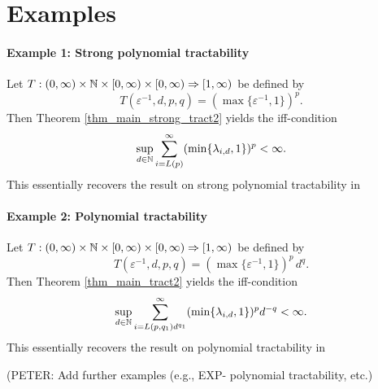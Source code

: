 \documentclass[11pt,a4paper]{article}
\newcommand{\peter}[1]{\begingroup\color{purple}#1\endgroup}
\begin{document}
\section{Examples}

\paragraph{Example 1: Strong polynomial tractability}

Let $T: (0,\infty) \times \mathbb{N} \times [0,\infty) \times [0,\infty)\Rightarrow [1,\infty)$
be defined by
\[
 T(\varepsilon^{-1},d,p,q)= (\max\{\varepsilon^{-1},1\})^p .
\]
Then Theorem \ref{thm_main_strong_tract2} yields the iff-condition
\[
 \sup_{d\in\mathbb{N}} \sum_{i=L(p)}^\infty (\min\{\lambda_{i,d},1\})^p < \infty.
\]
This essentially recovers the result on strong polynomial tractability in \cite[Theorem 5.1]{NW08}

\paragraph{Example 2: Polynomial tractability}

Let $T: (0,\infty) \times \mathbb{N} \times [0,\infty) \times [0,\infty)\Rightarrow [1,\infty)$
be defined by
\[
 T(\varepsilon^{-1},d,p,q)= (\max\{\varepsilon^{-1},1\})^p\, d^q.
\]
Then Theorem \ref{thm_main_tract2} yields the iff-condition
\[
 \sup_{d\in\mathbb{N}} \sum_{i=L(p,q_1) d^{q_1}}^\infty (\min\{\lambda_{i,d},1\})^p d^{-q} < \infty.
\]
This essentially recovers the result on polynomial tractability in \cite[Theorem 5.1]{NW08}



\peter{(PETER: Add further examples (e.g., EXP- polynomial tractability, etc.)}

\bigskip
\end{document}
